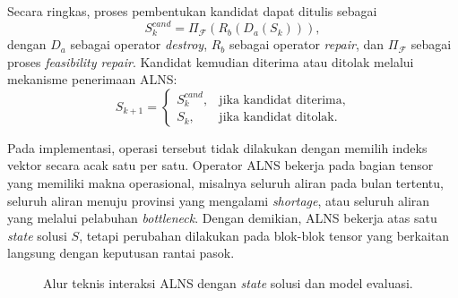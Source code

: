\documentclass{file/TA-ITS}
\theoremstyle{definition}
\theoremstyle{definition}
\theoremstyle{plain}
\begin{document}
Secara ringkas, proses pembentukan kandidat dapat ditulis sebagai
\[
S^{cand}_k =
\Pi_{\mathcal{F}}
\left(
R_b
\left(
D_a(S_k)
\right)
\right),
\]
dengan \(D_a\) sebagai operator \textit{destroy}, \(R_b\) sebagai operator \textit{repair}, dan \(\Pi_{\mathcal{F}}\) sebagai proses \textit{feasibility repair}. Kandidat kemudian diterima atau ditolak melalui mekanisme penerimaan ALNS:
\[
S_{k+1}
=
\begin{cases}
S^{cand}_k, & \text{jika kandidat diterima},\\
S_k, & \text{jika kandidat ditolak}.
\end{cases}
\]

Pada implementasi, operasi tersebut tidak dilakukan dengan memilih indeks vektor secara acak satu per satu. Operator ALNS bekerja pada bagian tensor yang memiliki makna operasional, misalnya seluruh aliran pada bulan tertentu, seluruh aliran menuju provinsi yang mengalami \textit{shortage}, atau seluruh aliran yang melalui pelabuhan \textit{bottleneck}. Dengan demikian, ALNS bekerja atas satu \textit{state} solusi \(S\), tetapi perubahan dilakukan pada blok-blok tensor yang berkaitan langsung dengan keputusan rantai pasok.

\begin{figure}[H]
\centering
{}
\caption{Alur teknis interaksi ALNS dengan \textit{state} solusi dan model evaluasi.}
\label{fig:alns_state_interaction}
\end{figure}
\end{document}
